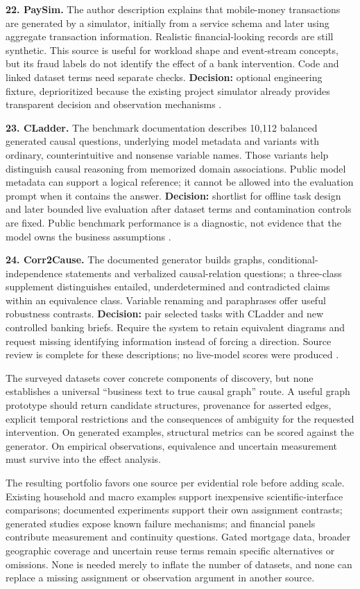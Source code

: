\textbf{22. PaySim.} The author description explains that mobile-money
transactions are generated by a simulator, initially from a service
schema and later using aggregate transaction information. Realistic
financial-looking records are still synthetic. This source is useful for
workload shape and event-stream concepts, but its fraud labels do not
identify the effect of a bank intervention. Code and linked dataset
terms need separate checks. \textbf{Decision:} optional engineering
fixture, deprioritized because the existing project simulator already
provides transparent decision and observation mechanisms
\citep{pd15_paysim_pinned}.

\textbf{23. CLadder.} The benchmark documentation describes 10,112
balanced generated causal questions, underlying model metadata and
variants with ordinary, counterintuitive and nonsense variable names.
Those variants help distinguish causal reasoning from memorized domain
associations. Public model metadata can support a logical reference; it
cannot be allowed into the evaluation prompt when it contains the
answer. \textbf{Decision:} shortlist for offline task design and later
bounded live evaluation after dataset terms and contamination controls
are fixed. Public benchmark performance is a diagnostic, not evidence
that the model owns the business assumptions
\citep{pd15_cladder_pinned}.

\textbf{24. Corr2Cause.} The documented generator builds graphs,
conditional-independence statements and verbalized causal-relation
questions; a three-class supplement distinguishes entailed,
underdetermined and contradicted claims within an equivalence class.
Variable renaming and paraphrases offer useful robustness contrasts.
\textbf{Decision:} pair selected tasks with CLadder and new controlled
banking briefs. Require the system to retain equivalent diagrams and
request missing identifying information instead of forcing a direction.
Source review is complete for these descriptions; no live-model scores
were produced \citep{pd15_corr2cause_pinned}.

The surveyed datasets cover concrete components of discovery, but none
establishes a universal ``business text to true causal graph'' route. A
useful graph prototype should return candidate structures, provenance
for asserted edges, explicit temporal restrictions and the consequences
of ambiguity for the requested intervention. On generated examples,
structural metrics can be scored against the generator. On empirical
observations, equivalence and uncertain measurement must survive into
the effect analysis.

The resulting portfolio favors one source per evidential role before adding scale. Existing household and macro examples support inexpensive scientific-interface comparisons; documented experiments support their own assignment contrasts; generated studies expose known failure mechanisms; and financial panels contribute measurement and continuity questions. Gated mortgage data, broader geographic coverage and uncertain reuse terms remain specific alternatives or omissions. None is needed merely to inflate the number of datasets, and none can replace a missing assignment or observation argument in another source.

